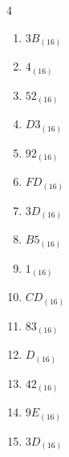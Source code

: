 \begin{multicols}{4}
\begin{enumerate}
        \phantom{$=117$}

  \item $3B_{(16)}$

        \phantom{$=59$}

  \item $4_{(16)}$

        \phantom{$=4$}

  \item $52_{(16)}$

        \phantom{$=82$}

  \item $D3_{(16)}$

        \phantom{$=211$}

  \item $92_{(16)}$

        \phantom{$=146$}

  \item $FD_{(16)}$

        \phantom{$=253$}

  \item $3D_{(16)}$

        \phantom{$=61$}

  \item $B5_{(16)}$

        \phantom{$=181$}

  \item $1_{(16)}$

        \phantom{$=1$}

  \item $CD_{(16)}$

        \phantom{$=205$}

  \item $83_{(16)}$

        \phantom{$=131$}

  \item $D_{(16)}$

        \phantom{$=13$}

  \item $42_{(16)}$

        \phantom{$=66$}

\columnbreak %

  \item $9E_{(16)}$

        \phantom{$=158$}

  \item $3D_{(16)}$

        \phantom{$=61$}


\end{enumerate}
\end{multicols}
